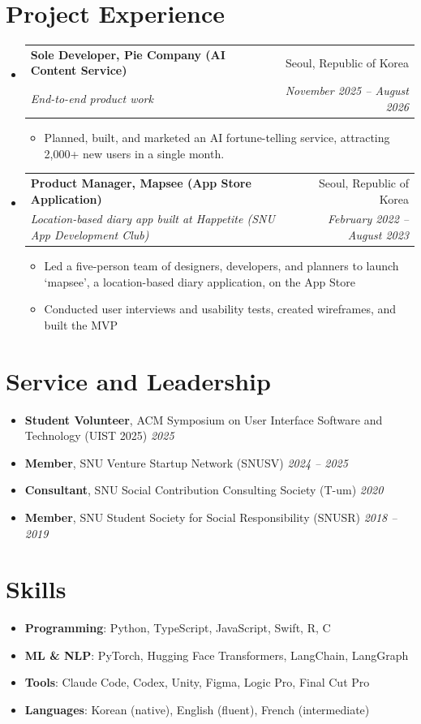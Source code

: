 \documentclass[letterpaper,10pt]{article}
\makeatletter
\newcommand{\ENTRYSEP}{0.4em}\newcommand{\PLAINSEP}{0.3em}
\newcommand{\DETSEP}{0.14em}\newcommand{\TOPSEP}{0.35em}
\newcommand{\ENTRYDROP}{-0.15em}
\newcommand{\ENTRYSEP}{0.18em}\newcommand{\PLAINSEP}{0.15em}
\newcommand{\DETSEP}{0.06em}\newcommand{\TOPSEP}{0.18em}
\newcommand{\ENTRYDROP}{-0.35em}
\let\oldsection\section
\renewcommand{\section}[1]{\needspace{8\baselineskip}\oldsection{#1}}
\newcommand{\entry}[4]{%
  \needspace{3.2\baselineskip}\item
  \begin{tabularx}{\linewidth}[t]{@{}>{\raggedright\arraybackslash}X@{\hspace{1.2em}}r@{}}
    \textbf{#1} & #2 \\[0.05em]
    \textit{\small #3} & \textit{\small #4} \\
  \end{tabularx}\vspace{\ENTRYDROP}%
}
\newenvironment{entries}
  {\begin{itemize}[leftmargin=1.2em, itemsep=\ENTRYSEP, parsep=0pt, topsep=\TOPSEP]}
  {\end{itemize}}
\newenvironment{details}
  {\begin{itemize}[label=$\circ$, leftmargin=1.4em, itemsep=\DETSEP, parsep=0pt, topsep=\TOPSEP]}
  {\end{itemize}\vspace{-0.2em}}
\newenvironment{plain}
  {\begin{itemize}[leftmargin=1.2em, itemsep=\PLAINSEP, parsep=0pt, topsep=\TOPSEP]}
  {\end{itemize}}
\makeatother
\begin{document}
\section{Project Experience}
\begin{entries}
  \entry{Sole Developer, Pie Company (AI Content Service)}{Seoul, Republic of Korea}
        {End-to-end product work}{November 2025 -- August 2026}
  \begin{details}
    \item Planned, built, and marketed an AI fortune-telling service, attracting 2,000+ new
          users in a single month.
  \end{details}

  \entry{Product Manager, Mapsee (App Store Application)}{Seoul, Republic of Korea}
        {Location-based diary app built at Happetite (SNU App Development Club)}{February 2022 -- August 2023}
  \begin{details}
    \item Led a five-person team of designers, developers, and planners to launch `mapsee',
          a location-based diary application, on the App Store
    \item Conducted user interviews and usability tests, created wireframes, and built the MVP
  \end{details}
\end{entries}

\section{Service and Leadership}
\begin{plain}
  \item \textbf{Student Volunteer}, ACM Symposium on User Interface Software and Technology
        (UIST 2025) \hfill \textit{\small 2025}
  \item \textbf{Member}, SNU Venture Startup Network (SNUSV) \hfill \textit{\small 2024 -- 2025}
  \item \textbf{Consultant}, SNU Social Contribution Consulting Society (T-um) \hfill \textit{\small 2020}
  \item \textbf{Member}, SNU Student Society for Social Responsibility (SNUSR) \hfill \textit{\small 2018 -- 2019}
\end{plain}

\section{Skills}
\begin{plain}
  \item \textbf{Programming}: Python, TypeScript, JavaScript, Swift, R, C
  \item \textbf{ML \& NLP}: PyTorch, Hugging Face Transformers, LangChain, LangGraph
  \item \textbf{Tools}: Claude Code, Codex, Unity, Figma, Logic Pro, Final Cut Pro
  \item \textbf{Languages}: Korean (native), English (fluent),
        French (intermediate)
\end{plain}
\end{document}
